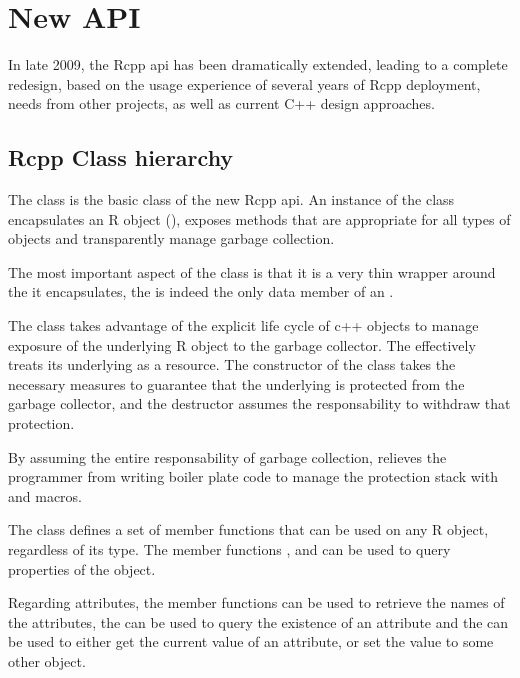 \section{New  API}
\label{sec:new_rcpp}

In late 2009, the Rcpp api has been dramatically extended, leading to a 
complete redesign, based on the usage experience of several 
years of Rcpp deployment, needs from other projects, 
as well as current C++ design approaches.

\subsection{Rcpp Class hierarchy}

The  class is the basic class of the new Rcpp api. 
An instance of the  class encapsulates an R object
(), exposes methods that are appropriate for all types 
of objects and transparently manage garbage collection.

The most important aspect of the  class is that it is 
a very thin wrapper around the  it encapsulates, the 
 is indeed the only data member of an .

The  class takes advantage of the explicit life cycle of 
c++ objects to manage exposure of the underlying R object to the 
garbage collector. The  effectively treats 
its underlying  as a resource.
The constructor of the  class takes 
the necessary measures to guarantee that the underlying 
is protected from the garbage collector, and the destructor
assumes the responsability to withdraw that protection. 

By assuming the entire responsability of garbage collection, 
relieves the programmer from writing boiler plate code to manage
the protection stack with  and  macros.

The  class defines a set of member functions that
can be used on any R object, regardless of its type. The member
functions ,  and  can be 
used to query properties of the object. 

Regarding attributes, the member functions 
 can be used to retrieve the names of the attributes, 
the  can be used to query the existence of an attribute and 
the  can be used to either get the current value of an 
attribute, or set the value to some other object.

